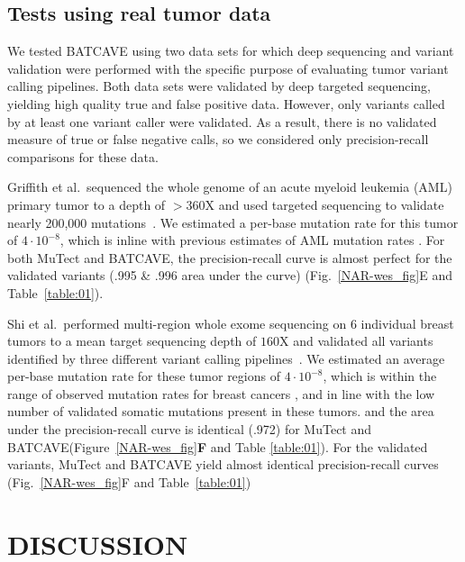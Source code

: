 \documentclass[a4,center,fleqn]{NAR}
\newcommand{\batcave}{BATCAVE\xspace}
\begin{document}
\subsection{Tests using real tumor data}
We tested \batcave using two data sets for which deep sequencing and variant validation were performed with the specific purpose of evaluating tumor variant calling pipelines.
Both data sets were validated by deep targeted sequencing, yielding high quality true and false positive data.
However, only variants called by at least one variant caller were validated.
As a result, there is no validated measure of true or false negative calls, so we considered only precision-recall comparisons for these data.

Griffith et al.\ sequenced the whole genome of an acute myeloid leukemia (AML) primary tumor to a depth of $>$360X and used targeted sequencing to validate nearly 200,000 mutations~\cite{Griffith2015}.
We estimated a per-base mutation rate for this tumor of $4\cdot10^{-8}$, which is inline with previous estimates of AML mutation rates \cite{Griffith2015,Williams2018}.
For both MuTect and \batcave, the precision-recall curve is almost perfect for the validated variants (.995 \& .996 area under the curve) (Fig.~\ref{NAR-wes_fig}E and Table~\ref{table:01}).

Shi et al.\ performed multi-region whole exome sequencing on 6 individual breast tumors to a mean target sequencing depth of $160\mathrm{X}$ and validated all variants identified by three different variant calling pipelines~\cite{Shi2018}.
We estimated an average per-base mutation rate for these tumor regions of $4\cdot10^{-8}$, which is within the range of observed mutation rates for breast cancers \citep{Alexandrov2019}, and in line with the low number of validated somatic mutations present in these tumors.
and the area under the precision-recall curve is identical (.972) for MuTect and \batcave (Figure~\ref{NAR-wes_fig}\textbf{F} and Table \ref{table:01}).
For the validated variants, MuTect and \batcave yield almost identical precision-recall curves (Fig.~\ref{NAR-wes_fig}F and Table~\ref{table:01})

\section{DISCUSSION}
 
\end{document}
